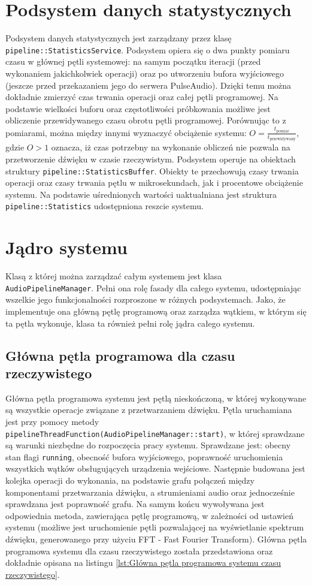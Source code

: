 \section{Podsystem danych statystycznych}
Podsystem danych statystycznych jest zarządzany przez klasę \texttt{pipeline::StatisticsService}. Podsystem opiera się o dwa punkty pomiaru czasu w głównej pętli systemowej: na samym początku iteracji (przed wykonaniem jakichkolwiek operacji) oraz po utworzeniu bufora wyjściowego (jeszcze przed przekazaniem jego do serwera PulseAudio). Dzięki temu można dokładnie zmierzyć czas trwania operacji oraz całej pętli programowej. Na podstawie wielkości buforu oraz częstotliwości próbkowania możliwe jest obliczenie przewidywanego czasu obrotu pętli programowej. Porównując to z pomiarami, można między innymi wyznaczyć obciążenie systemu: $O = \frac{t_{\text{pomiar}}}{t_{\text{przewidywany}}}$, gdzie $O > 1$ oznacza, iż czas potrzebny na wykonanie obliczeń nie pozwala na przetworzenie dźwięku w czasie rzeczywistym. Podsystem operuje na obiektach struktury \texttt{pipeline::StatisticsBuffer}. Obiekty te przechowują czasy trwania operacji oraz czasy trwania pętlu w mikrosekundach, jak i procentowe obciążenie systemu. Na podstawie uśrednionych wartości uaktualniana jest struktura \texttt{pipeline::Statistics} udostępniona reszcie systemu.

\section{Jądro systemu}
Klasą z której można zarządzać całym systemem jest klasa \texttt{AudioPipelineManager}. Pełni ona rolę fasady dla całego systemu, udostępniając wszelkie jego funkcjonalności rozproszone w różnych podsystemach. Jako, że implementuje ona główną pętlę programową oraz zarządza wątkiem, w którym się ta pętla wykonuje, klasa ta również pełni rolę jądra całego systemu. 

\subsection{Główna pętla programowa dla czasu rzeczywistego}
Główna pętla programowa systemu jest pętlą nieskończoną, w której wykonywane są wszystkie operacje związane z przetwarzaniem dźwięku. Pętla uruchamiana jest przy pomocy metody \texttt{pipelineThreadFunction(AudioPipelineManager::start)}, w której sprawdzane są warunki niezbędne do rozpoczęcia pracy systemu. Sprawdzane jest: obecny stan flagi \texttt{running}, obecność bufora wyjściowego, poprawność uruchomienia wszystkich wątków obsługujących urządzenia wejściowe. Następnie budowana jest kolejka operacji do wykonania, na podstawie grafu połączeń między komponentami przetwarzania dźwięku, a strumieniami audio oraz jednocześnie sprawdzana jest poprawność grafu. Na samym końcu wywoływana jest odpowiednia metoda, zawierająca pętlę programową, w zależności od ustawień systemu (możliwe jest uruchomienie pętli pozwalającej na wyświetlanie spektrum dźwięku, generowanego przy użyciu FFT - Fast Fourier Transform). Główna pętla programowa systemu dla czasu rzeczywistego została przedstawiona oraz dokładnie opisana na listingu \ref{lst:Główna pętla programowa systemu czasu rzeczywistego}. 

